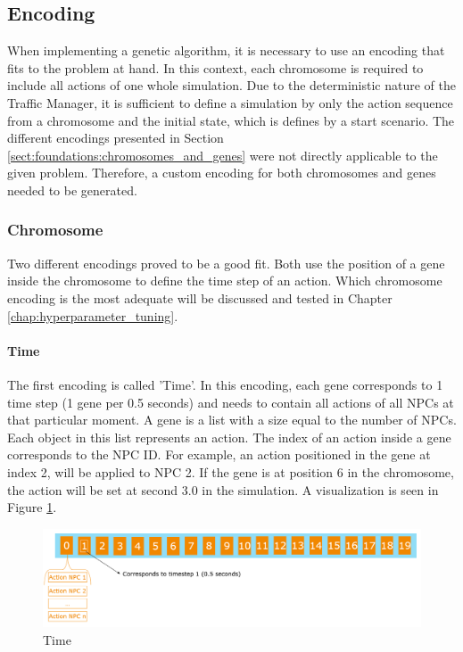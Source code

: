 \subsection{Encoding}
When implementing a genetic algorithm, it is necessary to use an encoding that fits to the problem at hand. In this context, each chromosome is required to include all actions of one whole simulation. Due to the deterministic nature of the Traffic Manager, it is sufficient to define a simulation by only the action sequence from a chromosome and the initial state, which is defines by a start scenario. The different encodings presented in Section \ref{sect:foundations:chromosomes_and_genes} were not directly applicable to the given problem. Therefore, a custom encoding for both chromosomes and genes needed to be generated.

\subsubsection{Chromosome}
Two different encodings proved to be a good fit. Both use the position of a gene inside the chromosome to define the time step of an action. Which chromosome encoding is the most adequate will be discussed and tested in Chapter \ref{chap:hyperparameter_tuning}.

\paragraph{Time}
The first encoding is called 'Time'. In this encoding, each gene corresponds to 1 time step (1 gene per 0.5 seconds) and needs to contain all actions of all NPCs at that particular moment. A gene is a list with a size equal to the number of NPCs. Each object in this list represents an action. The index of an action inside a gene corresponds to the NPC ID. For example, an action positioned in the gene at index 2, will be applied to NPC 2. If the gene is at position 6 in the chromosome, the action will be set at second 3.0 in the simulation. A visualization is seen in Figure \ref{fig:implementation:encoding_chromosome_time}.

\begin{figure}[ht] 
	\includegraphics[width=1\linewidth]{figures/time_encoding}
	\caption{Time}
	\label{fig:implementation:encoding_chromosome_time}
\end{figure}

